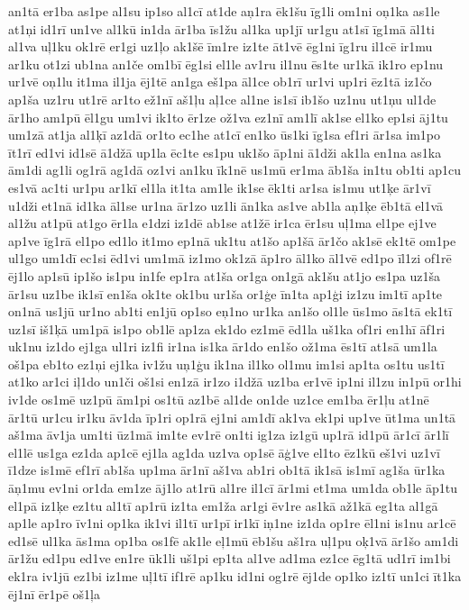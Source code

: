 {an1tā
er1ba
as1pe
al1su
ip1so
al1cī
at1de
aņ1ra
ēk1šu
īg1li
om1ni
oņ1ka
as1le
at1ņi
id1rī
un1ve
al1kū
in1da
ār1ba
īs1žu
al1ka
up1jī
ur1gu
at1sī
īg1mā
āl1ti
al1va
uļ1ku
ok1rē
er1gi
uz1ļo
ak1šē
īm1re
iz1te
āt1vē
ēg1ni
īg1ru
il1cē
ir1mu
ar1ku
ot1zi
ub1na
an1če
om1bī
ēg1si
el1le
av1ru
il1nu
ēs1te
ur1kā
ik1ro
ep1nu
ur1vē
oņ1lu
it1ma
il1ja
ēj1tē
an1ga
eš1pa
āl1ce
ob1rī
ur1vi
up1ri
ēz1tā
iz1čo
ap1ša
uz1ru
ut1rē
ar1to
ež1nī
aš1ļu
aļ1ce
al1ne
is1sī
ib1šo
uz1nu
ut1ņu
ul1de
ār1ho
am1pū
ēl1gu
um1vi
ik1to
ēr1ze
ož1va
ez1nī
am1lī
ak1se
el1ko
ep1si
āj1tu
um1zā
at1ja
al1ķī
az1dā
or1to
ec1he
at1cī
en1ko
ūs1ki
īg1sa
ef1ri
ār1sa
im1po
īt1rī
ed1vi
id1sē
ā1džā
up1la
ēc1te
es1pu
uk1šo
āp1ni
ā1dži
ak1la
en1na
as1ka
ām1di
ag1li
og1rā
ag1dā
oz1vi
an1ku
īk1nē
us1mū
er1ma
āb1ša
in1tu
ob1ti
ap1cu
es1vā
ac1ti
ur1pu
ar1kī
el1la
it1ta
am1le
ik1se
ēk1ti
ar1sa
is1mu
ut1ķe
ār1vī
u1dži
et1nā
id1ka
āl1se
ur1na
ār1zo
uz1li
ān1ka
as1ve
ab1la
aņ1ķe
ēb1tā
el1vā
al1žu
at1pū
at1go
ēr1la
e1dzi
iz1dē
ab1se
at1žē
ir1ca
ēr1su
uļ1ma
el1pe
ej1ve
ap1ve
īg1rā
el1po
ed1lo
it1mo
ep1nā
uk1tu
at1šo
ap1šā
ār1čo
ak1sē
ek1tē
om1pe
ul1go
um1dī
ec1si
ēd1vi
um1mā
iz1mo
ok1zā
āp1ro
āl1ko
āl1vē
ed1po
īl1zi
of1rē
ēj1lo
ap1sū
ip1šo
is1pu
in1fe
ep1ra
at1ša
or1ga
on1gā
ak1šu
at1jo
es1pa
uz1ša
ār1su
uz1be
ik1sī
en1ša
ok1te
ok1bu
ur1ša
or1ģe
īn1ta
ap1ģi
iz1zu
im1tī
ap1te
on1nā
us1jū
ur1no
ab1ti
en1jū
op1so
eņ1no
ur1ka
an1šo
ol1le
ūs1mo
ās1tā
ek1tī
uz1sī
iš1ķā
um1pā
is1po
ob1lē
ap1za
ek1do
ez1mē
ēd1la
uš1ka
of1ri
en1hī
āf1ri
uk1nu
iz1do
ej1ga
ul1ri
iz1fi
ir1na
is1ka
ār1do
en1šo
ož1ma
ēs1tī
at1sā
um1la
oš1pa
eb1to
ez1ņi
ej1ka
iv1žu
uņ1ģu
ik1na
il1ko
ol1mu
im1si
ap1ta
os1tu
us1tī
at1ko
ar1ci
iļ1do
un1či
oš1si
en1zā
ir1zo
i1džā
uz1ba
er1vē
ip1ni
il1zu
in1pū
or1hi
iv1de
os1mē
uz1pū
ām1pi
os1tū
az1bē
al1de
on1de
uz1ce
em1ba
ēr1ļu
at1nē
ār1tū
ur1cu
ir1ku
āv1da
īp1ri
op1rā
ej1ni
am1dī
ak1va
ek1pi
up1ve
ūt1ma
un1tā
aš1ma
āv1ja
um1ti
ūz1mā
im1te
ev1rē
on1ti
ig1za
iz1gū
up1rā
id1pū
ār1cī
ār1lī
el1lē
us1ga
ez1da
ap1cē
ej1la
ag1da
uz1va
op1sē
āģ1ve
el1to
ēz1kū
eš1vi
uz1vī
ī1dze
is1mē
ef1rī
ab1ša
up1ma
ār1nī
aš1va
ab1ri
ob1tā
ik1sā
is1mī
ag1ša
ūr1ka
āņ1mu
ev1ni
or1da
em1ze
āj1lo
at1rū
al1re
il1cī
ār1mi
et1ma
um1da
ob1le
āp1tu
el1pā
iz1ķe
ez1tu
al1tī
ap1rū
iz1ta
em1ža
ar1gi
ēv1re
as1kā
až1kā
eg1ta
al1gā
ap1le
ap1ro
īv1ni
op1ka
ik1vi
il1tī
ur1pī
ir1kī
iņ1ne
iz1da
op1re
ēl1ni
is1nu
ar1cē
ed1sē
ul1ka
ās1ma
op1ba
os1fē
ak1le
eļ1mū
ēb1šu
aš1ra
uļ1pu
oķ1vā
ār1šo
am1di
ār1žu
ed1pu
ed1ve
en1re
ūk1li
uš1pi
ep1ta
al1ve
ad1ma
ez1ce
ēg1tā
ud1rī
im1bi
ek1ra
iv1jū
ez1bi
iz1me
uļ1tī
if1rē
ap1ku
id1ni
og1rē
ēj1de
op1ko
iz1tī
un1ci
īt1ka
ēj1nī
ēr1pē
oš1ļa
}
